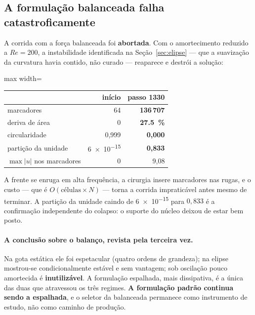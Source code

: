 \subsection{A formula\c{c}\~ao balanceada falha catastroficamente}

A corrida com a for\c{c}a balanceada foi \textbf{abortada}. Com o amortecimento
reduzido a $Re=200$, a instabilidade identificada na Se\c{c}\~ao~\ref{sec:elipse}
--- que a suaviza\c{c}\~ao da curvatura havia contido, n\~ao curado --- reaparece
e destr\'oi a solu\c{c}\~ao:

\begin{center}
\begin{adjustbox}{max width=\linewidth}
\begin{tabular}{lrr}
\toprule
 & in\'icio & passo 1330 \\
\midrule
marcadores                & 64      & \textbf{136\,707} \\
deriva de \'area          & 0       & \textbf{\SI{27.5}{\percent}} \\
circularidade             & 0{,}999 & \textbf{0{,}000} \\
parti\c{c}\~ao da unidade & \num{6e-15} & \textbf{0{,}833} \\
$\max\lvert u\rvert$ nos marcadores & 0 & 9{,}08 \\
\bottomrule
\end{tabular}
\end{adjustbox}
\end{center}

A frente se enruga em alta frequ\^encia, a cirurgia insere marcadores nas rugas,
e o custo --- que \'e $O(\text{c\'elulas}\times N)$ --- torna a corrida
impratic\'avel antes mesmo de terminar. A parti\c{c}\~ao da unidade caindo de
\num{6e-15} para $0{,}833$ \'e a confirma\c{c}\~ao independente do colapso: o
suporte do n\'ucleo deixou de estar bem posto.

\paragraph{A conclus\~ao sobre o balan\c{c}o, revista pela terceira vez.} Na gota
est\'atica ele foi espetacular (quatro ordens de grandeza); na elipse mostrou-se
condicionalmente est\'avel e sem vantagem; sob oscila\c{c}\~ao pouco amortecida
\'e \textbf{inutiliz\'avel}. A formula\c{c}\~ao espalhada, mais dissipativa, \'e
a \'unica das duas que atravessou os tr\^es regimes. \textbf{A formula\c{c}\~ao
padr\~ao continua sendo a espalhada}, e o seletor da balanceada permanece como
instrumento de estudo, n\~ao como caminho de produ\c{c}\~ao.

